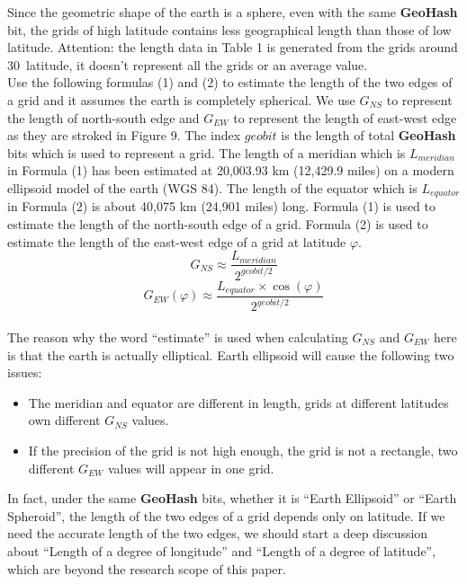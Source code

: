 \documentclass[sigplan,screen]{acmart}
\begin{document}
Since the geometric shape of the earth is a sphere, even with the same \textbf{GeoHash} bit, the grids of high latitude contains less geographical length than those of low latitude.
Attention: the length data in Table 1 is generated from the grids around 30\degree\ latitude, it doesn't represent all the grids or an average value.
\\
Use the following formulas (1) and (2) to estimate the length of the two edges of a grid and it assumes the earth is completely spherical.
We use $G_{NS}$ to represent the length of north-south edge and $G_{EW}$ to represent the length of east-west edge as they are stroked in Figure 9.
The index $geobit$ is the length of total \textbf{GeoHash} bits which is used to represent a grid.
The length of a meridian which is $L_{meridian}$ in Formula (1) has been estimated at 20,003.93 km (12,429.9 miles) on a modern ellipsoid model of the earth (WGS 84)\cite{weintrit2013so}.
The length of the equator which is $L_{equator}$ in Formula (2) is about 40,075 km (24,901 miles) long\cite{equator2011}.
Formula (1) is used to estimate the length of the north-south edge of a grid.
Formula (2) is used to estimate the length of the east-west edge of a grid at latitude $\varphi$.
\begin{equation}
	G_{NS}\approx\frac{L_{meridian}}{2^{geobit/2}}
\end{equation}
\begin{equation}
	G_{EW}(\varphi)\approx\frac{L_{equator}\times\cos(\varphi)}{2^{geobit/2}}
\end{equation}
\\
The reason why the word ``estimate'' is used when calculating $G_{NS}$ and $G_{EW}$ here is that the earth is actually elliptical.
Earth ellipsoid will cause the following two issues:
\begin{itemize}
	\item The meridian and equator are different in length, grids at different latitudes own different $G_{NS}$ values.
	\item If the precision of the grid is not high enough, the grid is not a rectangle, two different $G_{EW}$ values will appear in one grid.
\end{itemize}
In fact, under the same \textbf{GeoHash} bits, whether it is ``Earth Ellipsoid'' or ``Earth Spheroid'', the length of the two edges of a grid depends only on latitude.
If we need the accurate length of the two edges, we should start a deep discussion about ``Length of a degree of longitude'' and ``Length of a degree of latitude'', which are beyond the research scope of this paper.
\end{document}
